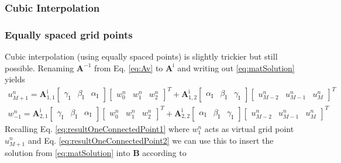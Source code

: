 \documentclass[dvipsnames]{article}
\begin{document}
\subsubsection{Cubic Interpolation}
\subsubsection*{Equally spaced grid points}
Cubic interpolation (using equally spaced points) is slightly trickier but still possible. Renaming $\mathbf{A}^{-1}$ from Eq. \eqref{eq:Av} to $\mathbf{A}^\text{i}$ and writing out \eqref{eq:matSolution} yields
\begin{align}
    u_{M+1}^n = \mathbf{A}^\text{i}_{1, 1}\begin{bmatrix}
   \gamma_\text{I} & \beta_\text{I} & \alpha_\text{I}
    \end{bmatrix} \begin{bmatrix}
   w_0^n & w_1^n &w_2^n
    \end{bmatrix}^T + \mathbf{A}^\text{i}_{1, 2}\begin{bmatrix}
   \alpha_\text{I} & \beta_\text{I} & \gamma_\text{I}
    \end{bmatrix} \begin{bmatrix}
   u_{M-2}^n & u_{M-1}^n &u_M^n
    \end{bmatrix}^T\\
    w_{-1}^n = \mathbf{A}^\text{i}_{2, 1}\begin{bmatrix}
   \gamma_\text{I} & \beta_\text{I} & \alpha_\text{I}
    \end{bmatrix} \begin{bmatrix}
   w_0^n & w_1^n &w_2^n
    \end{bmatrix}^T + \mathbf{A}^\text{i}_{2, 2}\begin{bmatrix}
   \alpha_\text{I} & \beta_\text{I} & \gamma_\text{I}
    \end{bmatrix} \begin{bmatrix}
   u_{M-2}^n & u_{M-1}^n &u_M^n
    \end{bmatrix}^T
\end{align}
Recalling Eq. \eqref{eq:resultOneConnectedPoint1} where $w_1^n$ acts as virtual grid point $u_{M+1}^n$ and Eq. \eqref{eq:resultOneConnectedPoint2}
we can use this to insert the solution from \eqref{eq:matSolution} into $\mathbf{B}$ according to
\end{document}
